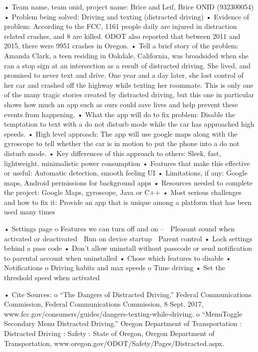 
•	Team name, team onid, project name: Brice and Leif, Brice ONID (932300054)
•	Problem being solved: Driving and texting (distracted driving)
•	Evidence of problem: According to the FCC, 1161 people daily are injured in distraction related crashes, and 8 are killed.  ODOT also reported that between 2011 and 2015, there were 9951 crashes in Oregon.
•	Tell a brief story of the problem: Amanda Clark, a teen residing in Oakdale, California, was broadsided when she ran a stop sign at an intersection as a result of distracted driving.  She lived, and promised to never text and drive.  One year and a day later, she lost control of her car and crashed off the highway while texting her roommate.  This is only one of the many tragic stories created by distracted driving, but this one in particular shows how much an app such as ours could save lives and help prevent these events from happening.
•	What the app will do to fix problem: Disable the temptation to text with a do not disturb mode while the car has approached high speeds. 
•	High level approach: The app will use google maps along with the gyroscope to tell whether the car is in motion to put the phone into a do not disturb mode.
•	Key differences of this approach to others:  Sleek, fast, lightweight, minimalistic power consumption
•	Features that make this effective or useful: Automatic detection, smooth feeling UI
•	Limitations, if any: Google maps, Android permissions for background apps
•	Resources needed to complete the project: Google Maps, gyroscope, Java or C++
•	Most serious challenges and how to fix it:  Provide an app that is unique among a platform that has been used many times


•	Settings page 
o	Features we can turn off and on – 
	Pleasant sound when activated or deactivated
	Run on device startup
	Parent control
•	Lock settings behind a pass code
•	Don’t allow uninstall without passcode or send notification to parental account when uninstalled
•	Chose which features to disable
•	Notifications
o	Driving habits and max speeds
o	Time driving
•	Set the threshold speed when activated







•	Cite Sources:
o	“The Dangers of Distracted Driving.” Federal Communications Commission, Federal Communications Commission, 8 Sept. 2017, www.fcc.gov/consumers/guides/dangers-texting-while-driving.
o	“MenuToggle Secondary Menu  Distracted Driving.” Oregon Department of Transportation : Distracted Driving : Safety : State of Oregon, Oregon Department of Transportation, www.oregon.gov/ODOT/Safety/Pages/Distracted.aspx.

